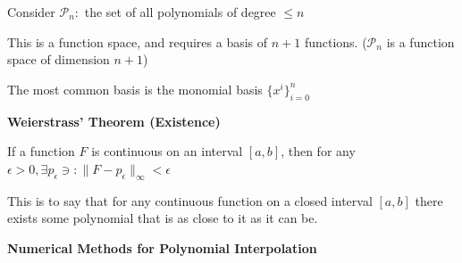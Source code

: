 \documentclass{article}
\begin{document}
Consider $\mathcal{P}_n:$ the set of all polynomials of degree $\leq n$

This is a function space, and requires a basis of $n + 1$ functions. ($\mathcal{P}_n$ is a function space of dimension $n + 1$)

The most common basis is the monomial basis $\{ x^i \}_{i = 0}^n$

\vspace{0.2cm}

\textbf{Weierstrass' Theorem (Existence)}

If a function $F$ is continuous on an interval $[a, b]$, then for any $\epsilon > 0, \exists p_{\epsilon} \ni: \| F - p_{\epsilon}\|_{\infty} < \epsilon$

This is to say that for any continuous function on a closed interval $[a,b]$ there exists some polynomial that is as close to it as it can be.

\vspace{0.2cm}

\textbf{Numerical Methods for Polynomial Interpolation}
\end{document}
